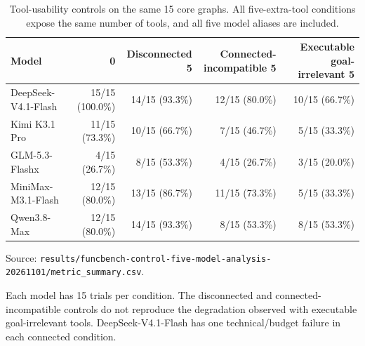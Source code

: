 \begin{table}[htbp]
\centering
\caption{Tool-usability controls on the same 15 core graphs. All five-extra-tool conditions expose the same number of tools, and all five model aliases are included.}
\label{tab:usability-controls}
\footnotesize
\setlength{\tabcolsep}{3pt}
\renewcommand{\arraystretch}{1.08}
\begin{tabularx}{\textwidth}{>{\raggedright\arraybackslash}Xrrrr}
\toprule
Model & 0 & Disconnected 5 & Connected-incompatible 5 & Executable goal-irrelevant 5 \\
\midrule
DeepSeek-V4.1-Flash & 15/15 (100.0\%) & 14/15 (93.3\%) & 12/15 (80.0\%) & 10/15 (66.7\%) \\
Kimi K3.1 Pro & 11/15 (73.3\%) & 10/15 (66.7\%) & 7/15 (46.7\%) & 5/15 (33.3\%) \\
GLM-5.3-Flashx & 4/15 (26.7\%) & 8/15 (53.3\%) & 4/15 (26.7\%) & 3/15 (20.0\%) \\
MiniMax-M3.1-Flash & 12/15 (80.0\%) & 13/15 (86.7\%) & 11/15 (73.3\%) & 5/15 (33.3\%) \\
Qwen3.8-Max & 12/15 (80.0\%) & 14/15 (93.3\%) & 8/15 (53.3\%) & 8/15 (53.3\%) \\
\bottomrule
\end{tabularx}
\par\parbox{\linewidth}{\raggedright\footnotesize Source: \texttt{results/\allowbreak{}funcbench-control-five-model-analysis-20261101/\allowbreak{}metric\_summary.csv}.}
\par\parbox{\linewidth}{\raggedright\footnotesize Each model has 15 trials per condition. The disconnected and connected-incompatible controls do not reproduce the degradation observed with executable goal-irrelevant tools. DeepSeek-V4.1-Flash has one technical/budget failure in each connected condition.}
\end{table}
